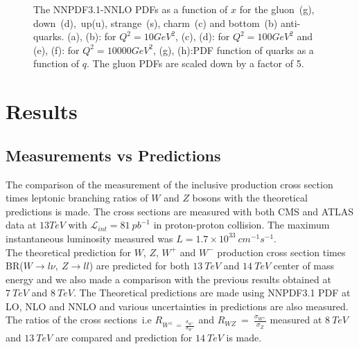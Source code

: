 \begin{figure}[H]
\begin{subfigure}{0.45\textwidth}
\vspace*{-8mm}
\caption{}
\end{subfigure}
\caption{The NNPDF3.1-NNLO PDFs as a function of $x$ for the gluon~(g), down~(d),~up(u), strange~(s), charm~(c) and bottom~(b) anti-quarks.  (a), (b): for $Q^{2}= 10GeV^{2}$, (c), (d): for $Q^{2}=100GeV^{2}$ and (e), (f): for $Q^{2}=10000GeV^{2}$, (g), (h):PDF function of quarks as a function of $q$. The gluon PDFs are scaled down by a factor of 5.} 
\label{nnpdf_nnlo1}
\end{figure}  


\section{Results}
\subsection{Measurements vs Predictions}
The comparison of the measurement of the inclusive production cross section times leptonic branching ratios of $W$ and $Z$ bosons with the theoretical predictions is made. The cross sections are measured with both CMS and ATLAS data at $13TeV$ with $\mathcal{L}_{int} = 81~pb^{-1}$ in proton-proton collision. The maximum instantaneous luminosity measured was $L = 1.7\times10^{33}~cm^{-1}s^{-1}$.\\
The theoretical prediction for $W$, $Z$, $W^{+}$ and $W^{-}$ production cross section times BR($W\rightarrow l\nu,~Z\rightarrow ll$) are predicted for both $13~TeV$ and $14~TeV$ center of mass energy and we also made a comparison with the previous results obtained at $7~TeV$ and $8~TeV$. The Theoretical predictions are made using NNPDF3.1 PDF at LO, NLO and NNLO and various uncertainties in predictions are also measured.\\
The ratios of the cross sections~i.e $R_{W^{\pm}~=~\frac{\sigma_{W^{+}}}{\sigma_{W^{-}}}}$ and $R_{WZ}~=~\frac{\sigma_{W^{\pm}}}{\sigma_{Z}}$ measured at $8~TeV$ and $13~TeV$ are compared and prediction for $14~TeV$ is made.\\


